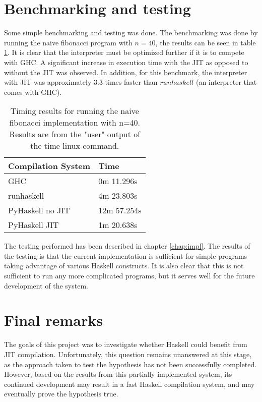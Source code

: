 \section{Benchmarking and testing}

Some simple benchmarking and testing was done. The benchmarking was done by
running the naive fibonacci program with $n=40$, the results can be seen in
table \ref{tab:benchmarks}.
It is clear that the interpreter must be optimized 
further if it is to compete with GHC. A significant increase in execution 
time with the JIT as opposed to without the JIT was observed. In addition,
for this benchmark, the interpreter with JIT was approximately $3.3$ times faster than
$runhaskell$ (an interpreter that comes with GHC).

\begin{table}[H]

\centering
\begin{tabular}{l|l}
\hline
\hline
Compilation System & Time \\
\hline
GHC               & 0m 11.296s  \\
runhaskell        & 4m 23.803s \\ 
PyHaskell no JIT   & 12m 57.254s \\
PyHaskell JIT      & 1m 20.638s \\
\hline
\end{tabular}

\caption{Timing results for running the naive fibonacci implementation with n=40. Results
are from the "user" output of the time linux command.}
\label{tab:benchmarks}


\end{table}

The testing performed has been described in chapter \ref{chap:impl}. The results of the 
testing is that the current implementation is sufficient for simple programs taking 
advantage of various Haskell constructs. It is also clear that this is not sufficient
to run any more complicated programs, but it serves well for the future development of
the system.

\section{Final remarks}

The goals of this project was to investigate whether Haskell could benefit from JIT 
compilation. Unfortunately, this question remains unanswered at this stage, as the
approach taken to test the hypothesis has not been successfully completed. However,
based on the results from this partially implemented system, its continued
development may result in a fast Haskell compilation system, and may eventually prove
the hypothesis true.


